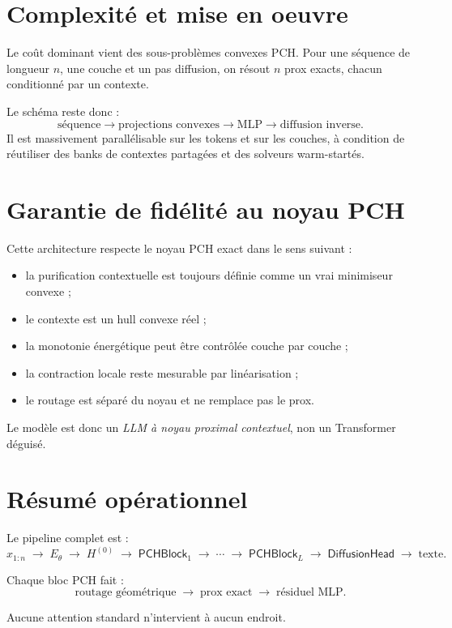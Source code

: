 \documentclass[11pt]{article}
\begin{document}
\section{Complexité et mise en oeuvre}

Le coût dominant vient des sous-problèmes convexes PCH.
Pour une séquence de longueur \(n\), une couche et un pas diffusion, on résout \(n\) prox exacts, chacun conditionné par un contexte.

Le schéma reste donc :
\[
\text{séquence} \to \text{projections convexes} \to \text{MLP} \to \text{diffusion inverse}.
\]
Il est massivement parallélisable sur les tokens et sur les couches, à condition de réutiliser des banks de contextes partagées et des solveurs warm-startés.

\section{Garantie de fidélité au noyau PCH}

Cette architecture respecte le noyau PCH exact dans le sens suivant :
\begin{itemize}[leftmargin=2em]
    \item la purification contextuelle est toujours définie comme un vrai minimiseur convexe ;
    \item le contexte est un hull convexe réel ;
    \item la monotonie énergétique peut être contrôlée couche par couche ;
    \item la contraction locale reste mesurable par linéarisation ;
    \item le routage est séparé du noyau et ne remplace pas le prox.
\end{itemize}

Le modèle est donc un \emph{LLM à noyau proximal contextuel}, non un Transformer déguisé.

\section{Résumé opérationnel}

Le pipeline complet est :
\[
x_{1:n}
\;\to\;
E_\theta
\;\to\;
H^{(0)}
\;\to\;
\mathsf{PCHBlock}_1
\;\to\;\cdots\;\to\;
\mathsf{PCHBlock}_L
\;\to\;
\mathsf{DiffusionHead}
\;\to\;
\text{texte}.
\]

Chaque bloc PCH fait :
\[
\text{routage géométrique}
\;\to\;
\text{prox exact}
\;\to\;
\text{résiduel MLP}.
\]

Aucune attention standard n'intervient à aucun endroit.
\end{document}
